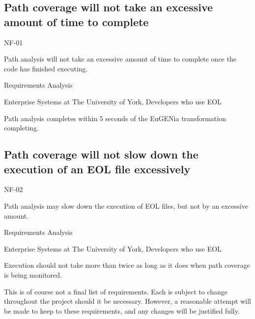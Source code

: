 \subsection{Path coverage will not take an excessive amount of time to complete}
\begin{description}[style=sameline,leftmargin=4.5cm,nolistsep]
\item[\hspace*{0.3cm}Label] NF-01
\item[\hspace*{0.3cm}Description] Path analysis will not take an excessive amount of time to complete once the code has finished executing.
\item[\hspace*{0.3cm}Source] Requirements Analysis
\item[\hspace*{0.3cm}Stakeholders] Enterprise Systems at The University of York, Developers who use EOL
\item[\hspace*{0.3cm}Satisfiable Conditions] Path analysis completes within 5 seconds of the EuGENia transformation completing.
\end{description}

\subsection{Path coverage will not slow down the execution of an EOL file excessively}
\begin{description}[style=sameline,leftmargin=4.5cm,nolistsep]
\item[\hspace*{0.3cm}Label] NF-02
\item[\hspace*{0.3cm}Description] Path analysis may slow down the execution of EOL files, but not by an excessive amount.
\item[\hspace*{0.3cm}Source] Requirements Analysis
\item[\hspace*{0.3cm}Stakeholders] Enterprise Systems at The University of York, Developers who use EOL
\item[\hspace*{0.3cm}Satisfiable Conditions] Execution should not take more than twice as long as it does when path coverage is being monitored.
\end{description}

This is of course not a final list of requirements. Each is subject to change throughout the project should it be necessary. However, a reasonable attempt will be made to keep to these requirements, and any changes will be justified fully.
